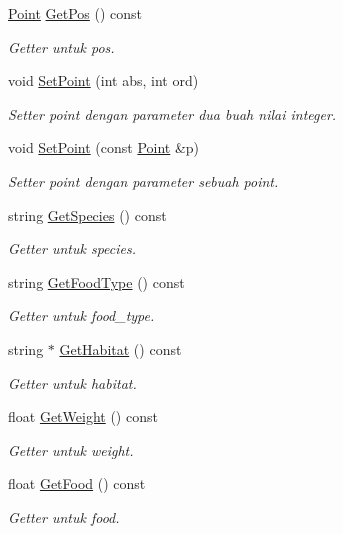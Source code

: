 \begin{DoxyCompactItemize}
\hyperlink{classPoint}{Point} \hyperlink{classAnimal_a183e4addbbccbe06a77e57bc8893cec1}{Get\+Pos} () const 
\begin{DoxyCompactList}\small\item\em Getter untuk pos. \end{DoxyCompactList}\item 
void \hyperlink{classAnimal_a754c7eb7a8ca6d8bd3e30650546a410d}{Set\+Point} (int abs, int ord)
\begin{DoxyCompactList}\small\item\em Setter point dengan parameter dua buah nilai integer. \end{DoxyCompactList}\item 
void \hyperlink{classAnimal_a02e187a6407bc83c46698544c912be15}{Set\+Point} (const \hyperlink{classPoint}{Point} \&p)
\begin{DoxyCompactList}\small\item\em Setter point dengan parameter sebuah point. \end{DoxyCompactList}\item 
string \hyperlink{classAnimal_a4c251e18f587980e69ec9f4c5cca3cfd}{Get\+Species} () const 
\begin{DoxyCompactList}\small\item\em Getter untuk species. \end{DoxyCompactList}\item 
string \hyperlink{classAnimal_a5517a48b723e94618de2ed908a109938}{Get\+Food\+Type} () const 
\begin{DoxyCompactList}\small\item\em Getter untuk food\+\_\+type. \end{DoxyCompactList}\item 
string $\ast$ \hyperlink{classAnimal_a07ea7b90c55213f0475ed3e7044101eb}{Get\+Habitat} () const 
\begin{DoxyCompactList}\small\item\em Getter untuk habitat. \end{DoxyCompactList}\item 
float \hyperlink{classAnimal_a84b2804414e0c5113a4fe1ca03fc3fff}{Get\+Weight} () const 
\begin{DoxyCompactList}\small\item\em Getter untuk weight. \end{DoxyCompactList}\item 
float \hyperlink{classAnimal_a284817c8f57078ebce4fd1f17d824223}{Get\+Food} () const 
\begin{DoxyCompactList}\small\item\em Getter untuk food. \end{DoxyCompactList}\item 

\end{DoxyCompactItemize}
